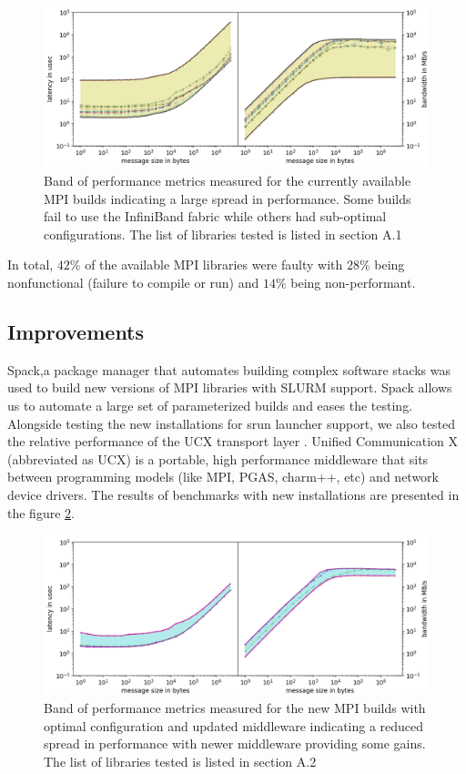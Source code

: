\documentclass[manuscript,screen]{acmart}
\begin{document}
\begin{figure}[h]
	\centering
	\includegraphics[width=1.05\linewidth]{curr_pearc}
	\caption{Band of performance metrics measured for the currently
			 available MPI builds indicating a large spread in 
			 performance. Some builds fail to use the InfiniBand fabric while others had sub-optimal configurations. The list of libraries tested is listed in section A.1}
	\label{fig:currmpi}
\end{figure}

In total, $42\%$ of the available MPI libraries were faulty with $28\%$ being nonfunctional (failure to compile or run) and $14\%$ being non-performant.

\subsection{Improvements}
 
Spack\cite{spack},a package manager that automates building complex software stacks was used to build new versions of MPI libraries with SLURM support. Spack allows us to automate a large set of parameterized builds and eases the testing. Alongside testing the new installations for srun launcher support, we also tested the relative performance of the UCX transport layer \cite{shamis2015ucx,openucx-website}. Unified Communication X (abbreviated as UCX) is a portable, high performance middleware that sits between programming models (like MPI, PGAS, charm++, etc) and network device drivers. The results of benchmarks with new installations are presented in the figure \ref{fig:newmpi}. 

\begin{figure}[h]
	\centering
	\includegraphics[width=1.05\linewidth]{new_pearc}
	\caption{Band of performance metrics measured for the new MPI
		builds with optimal configuration and updated middleware
		indicating a reduced spread in performance with newer middleware providing some gains. The list of libraries tested is listed in section A.2}
	\label{fig:newmpi}
\end{figure}
\end{document}
